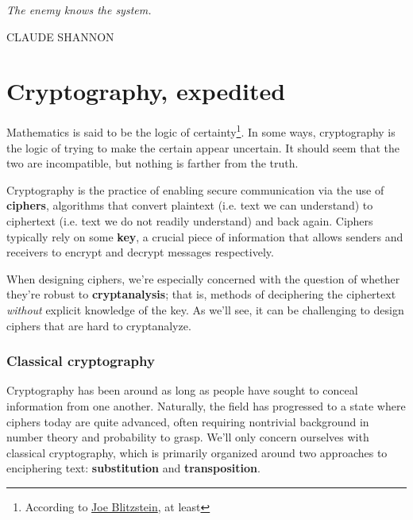 \documentclass{paper}
\newlength\longest
\begin{document}
\thispagestyle{empty}
\null\vfill

\settowidth{}

\begin{center}
    \parbox{\longest}{%
  \raggedright{\Large\itshape%
   The enemy knows the system. \par\bigskip
  }   
  \raggedleft\MakeUppercase{Claude Shannon}\par%
}

\end{center}


\vfill\vfill

\clearpage


\part{Cryptography, expedited}

Mathematics is said to be the logic of certainty\footnote{According to \href{https://twitter.com/stat110/status/288032140728365059?s=20}{Joe Blitzstein}, at least}. In some ways, cryptography is the logic of trying to make the certain appear uncertain. It should seem that the two are incompatible, but nothing is farther from the truth. 

\medskip

\Gls{Cryptography} is the practice of enabling secure communication via the use of \textbf{ciphers}, algorithms that convert plaintext (i.e. text we can understand) to ciphertext (i.e. text we do not readily understand) and back again. Ciphers typically rely on some \textbf{key}, a crucial piece of information that allows senders and receivers to encrypt and decrypt messages respectively.

\medskip
When designing ciphers, we're especially concerned with the question of whether they're robust to \textbf{cryptanalysis}; that is, methods of deciphering the ciphertext \textit{without} explicit knowledge of the key. As we'll see, it can be challenging to design ciphers that are hard to cryptanalyze.

\section{Classical cryptography}

Cryptography has been around as long as people have sought to conceal information from one another. Naturally, the field has progressed to a state where ciphers today are quite advanced, often requiring nontrivial background in number theory and probability to grasp. We'll only concern ourselves with classical cryptography, which is primarily organized around two approaches to enciphering text: \textbf{substitution} and \textbf{transposition}.
\end{document}
